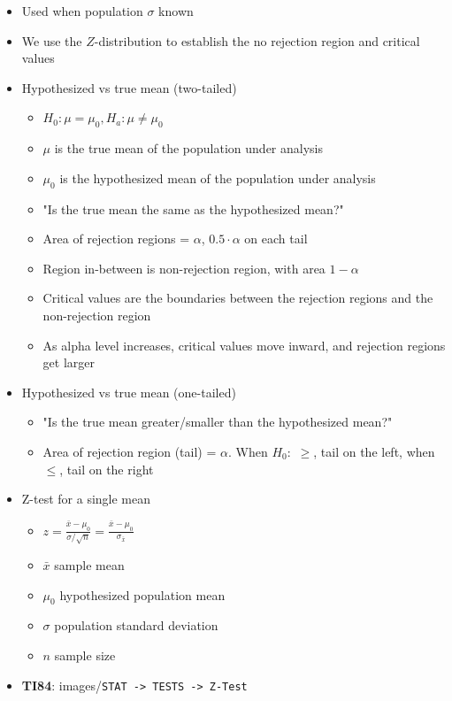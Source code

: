 \documentclass{article}
\newcommand{\code}[1]{images/\colorbox{light-gray}{\texttt{#1}}}
\begin{document}
\begin{itemize}
    \item Used when population $\sigma$ known
    \item We use the $Z$-distribution to establish the no rejection region and critical values
    \item Hypothesized vs true mean (two-tailed)
    \begin{itemize}
        \item $H_0: \mu = \mu_0, H_a: \mu \ne \mu_0$
        \item $\mu$ is the true mean of the population under analysis
        \item $\mu_0$ is the hypothesized mean of the population under analysis
        \item "Is the true mean the same as the hypothesized mean?"
        \item Area of rejection regions = $\alpha$, $0.5 \cdot \alpha$ on each tail
        \item Region in-between is non-rejection region, with area $1-\alpha$
        \item Critical values are the boundaries between the rejection regions and the non-rejection region
        \item As alpha level increases, critical values move inward, and rejection regions get larger
    \end{itemize}
    \item Hypothesized vs true mean (one-tailed)
    \begin{itemize}
        \item "Is the true mean greater/smaller than the hypothesized mean?"
        \item Area of rejection region (tail) = $\alpha$. When $H_0:$ $\geq$, tail on the left, when $\leq$, tail on the right
    \end{itemize}
    \item Z-test for a single mean
    \begin{itemize}
        \item $z=\frac{\bar{x} - \mu_0}{\sigma / \sqrt{n}}=\frac{\bar{x} - \mu_0}{\sigma_{\bar{x}}}$
        \item $\bar{x}$ sample mean
        \item $\mu_0$ hypothesized population mean
        \item $\sigma$ population standard deviation
        \item $n$ sample size
    \end{itemize}
    \item \textbf{TI84}: \code{STAT -> TESTS -> Z-Test}
\end{itemize}
\end{document}
